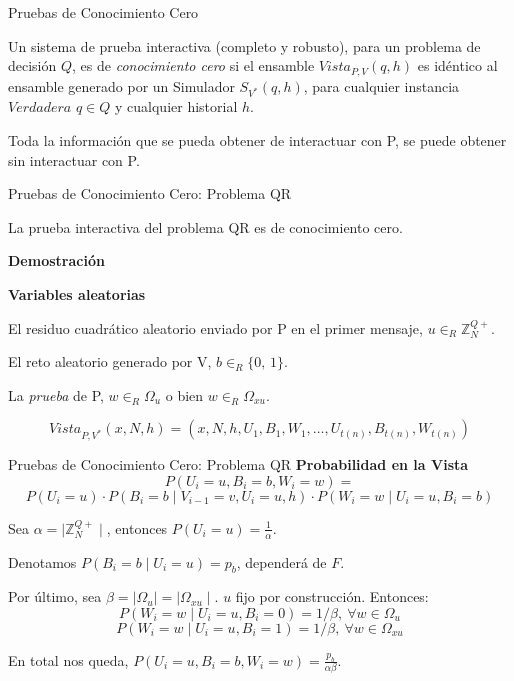 \documentclass{beamer}
\begin{document}
\begin{frame}{Pruebas de Conocimiento Cero}
	\begin{definition}
		Un sistema de prueba interactiva (completo y robusto), para un problema de decisión $Q$, es de \textit{conocimiento cero} si el ensamble $Vista_{P,V}(q,h)$ es idéntico al ensamble generado por un Simulador $S_{V^*}(q,h)$, para cualquier instancia $Verdadera$ $q\in Q$ y cualquier historial $h$.
	\end{definition}

	Toda la información que se pueda obtener de interactuar con P, se puede obtener sin interactuar con P.
\end{frame}



\begin{frame}{Pruebas de Conocimiento Cero: Problema QR}
	\begin{theorem}
		La prueba interactiva del problema QR es de conocimiento cero.
	\end{theorem}
	\textbf{Demostración}
	
	\textbf{Variables aleatorias}
	\begin{description}[Wi]
		\item[$U_i$] El residuo cuadrático aleatorio enviado por P en el primer mensaje, $u \in_R \mathbb{Z}^{Q+}_N$.
		
		\item[$B_i$] El reto aleatorio generado por V, $b \in_R \{0,\,1\}$.
		
		\item[$W_i$] La \textit{prueba} de P, $w \in_R \Omega_u$ o bien $w \in_R \Omega_{xu}$.
	\end{description}

	\[  Vista_{P,V^*}(x,N,h) = (x,N,h,U_1,B_1,W_1,\dots , U_{t(n)}, B_{t(n)}, W_{t(n)}) \]
\end{frame}

\begin{frame}{Pruebas de Conocimiento Cero: Problema QR}
	\textbf{Probabilidad en la Vista}
	\[
	P(U_i=u, B_i=b, W_i=w) = 
	\]
	\[ P(U_i=u)\cdot P(B_i=b \mid V_{i-1}=v, U_i=u,h) \cdot P(W_i=w \mid U_i=u, B_i=b) \]
	
	Sea $\alpha = \mid \mathbb{Z}^{Q+}_N \mid $, entonces $P(U_i=u) = \frac{1}{\alpha}$.
	
	Denotamos $ P(B_i=b \mid U_i=u)=p_b$, dependerá de $F$.
	
	Por último, sea $\beta = \mid \Omega_u \mid = \mid \Omega_{xu} \mid $. $u$ fijo por construcción. Entonces:
	\[P(W_i=w \mid U_i=u, B_i=0) = 1/\beta,\ \forall w \in \Omega_u\]
	\[P(W_i=w \mid U_i=u, B_i=1) = 1/\beta,\ \forall w \in \Omega_{xu}\]
	
	En total nos queda, $P(U_i=u, B_i=b, W_i=w) = \frac{p_b}{\alpha \beta}$.
\end{frame}
\end{document}
